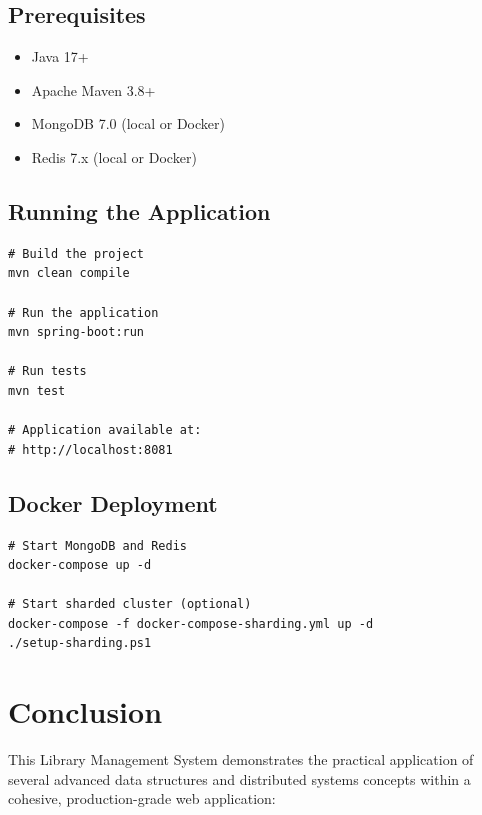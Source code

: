 \documentclass[12pt,a4paper]{report}
\begin{document}
\section{Prerequisites}
\begin{itemize}[noitemsep]
    \item Java 17+
    \item Apache Maven 3.8+
    \item MongoDB 7.0 (local or Docker)
    \item Redis 7.x (local or Docker)
\end{itemize}

\section{Running the Application}
\begin{lstlisting}[style=PropsStyle, caption={Build and Run Commands}]
# Build the project
mvn clean compile

# Run the application
mvn spring-boot:run

# Run tests
mvn test

# Application available at:
# http://localhost:8081
\end{lstlisting}

\section{Docker Deployment}
\begin{lstlisting}[style=PropsStyle, caption={Docker Compose Deployment}]
# Start MongoDB and Redis
docker-compose up -d

# Start sharded cluster (optional)
docker-compose -f docker-compose-sharding.yml up -d
./setup-sharding.ps1
\end{lstlisting}


\chapter{Conclusion}

This Library Management System demonstrates the practical application of several advanced data structures and distributed systems concepts within a cohesive, production-grade web application:
\end{document}
